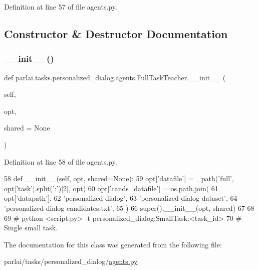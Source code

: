 Definition at line 57 of file agents.\+py.



\subsection{Constructor \& Destructor Documentation}
\mbox{\label{classparlai_1_1tasks_1_1personalized__dialog_1_1agents_1_1FullTaskTeacher_a2f07307405aafc3bc903ce7f172f45c0}} 
\subsubsection{\texorpdfstring{\+\_\+\+\_\+init\+\_\+\+\_\+()}{\_\_init\_\_()}}
{\footnotesize\ttfamily def parlai.\+tasks.\+personalized\+\_\+dialog.\+agents.\+Full\+Task\+Teacher.\+\_\+\+\_\+init\+\_\+\+\_\+ (\begin{DoxyParamCaption}\item[{}]{self,  }\item[{}]{opt,  }\item[{}]{shared = {\ttfamily None} }\end{DoxyParamCaption})}



Definition at line 58 of file agents.\+py.


\begin{DoxyCode}
58     \textcolor{keyword}{def }\_\_init\_\_(self, opt, shared=None):
59         opt[\textcolor{stringliteral}{'datafile'}] = \_path(\textcolor{stringliteral}{'full'}, opt[\textcolor{stringliteral}{'task'}].split(\textcolor{stringliteral}{':'})[2], opt)
60         opt[\textcolor{stringliteral}{'cands\_datafile'}] = os.path.join(
61             opt[\textcolor{stringliteral}{'datapath'}],
62             \textcolor{stringliteral}{'personalized-dialog'},
63             \textcolor{stringliteral}{'personalized-dialog-dataset'},
64             \textcolor{stringliteral}{'personalized-dialog-candidates.txt'},
65         )
66         super().\_\_init\_\_(opt, shared)
67 
68 
69 \textcolor{comment}{# python <script.py> -t personalized\_dialog:SmallTask:<task\_id>}
70 \textcolor{comment}{# Single small task.}
\end{DoxyCode}


The documentation for this class was generated from the following file\+:\begin{DoxyCompactItemize}
\item 
parlai/tasks/personalized\+\_\+dialog/\hyperlink{parlai_2tasks_2personalized__dialog_2agents_8py}{agents.\+py}\end{DoxyCompactItemize}
